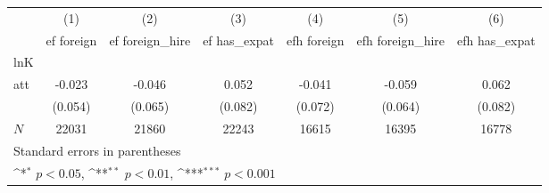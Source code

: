 {
\def\sym#1{\ifmmode^{#1}\else\(^{#1}\)\fi}
\begin{tabular}{l*{6}{c}}
\hline\hline
            &\multicolumn{1}{c}{(1)}&\multicolumn{1}{c}{(2)}&\multicolumn{1}{c}{(3)}&\multicolumn{1}{c}{(4)}&\multicolumn{1}{c}{(5)}&\multicolumn{1}{c}{(6)}\\
            &\multicolumn{1}{c}{ef foreign}&\multicolumn{1}{c}{ef foreign\_hire}&\multicolumn{1}{c}{ef has\_expat}&\multicolumn{1}{c}{efh foreign}&\multicolumn{1}{c}{efh foreign\_hire}&\multicolumn{1}{c}{efh has\_expat}\\
\hline
lnK         &                     &                     &                     &                     &                     &                     \\
att         &      -0.023         &      -0.046         &       0.052         &      -0.041         &      -0.059         &       0.062         \\
            &     (0.054)         &     (0.065)         &     (0.082)         &     (0.072)         &     (0.064)         &     (0.082)         \\
\hline
\(N\)       &       22031         &       21860         &       22243         &       16615         &       16395         &       16778         \\
\hline\hline
\multicolumn{7}{l}{\footnotesize Standard errors in parentheses}\\
\multicolumn{7}{l}{\footnotesize \sym{*} \(p<0.05\), \sym{**} \(p<0.01\), \sym{***} \(p<0.001\)}\\
\end{tabular}
}
